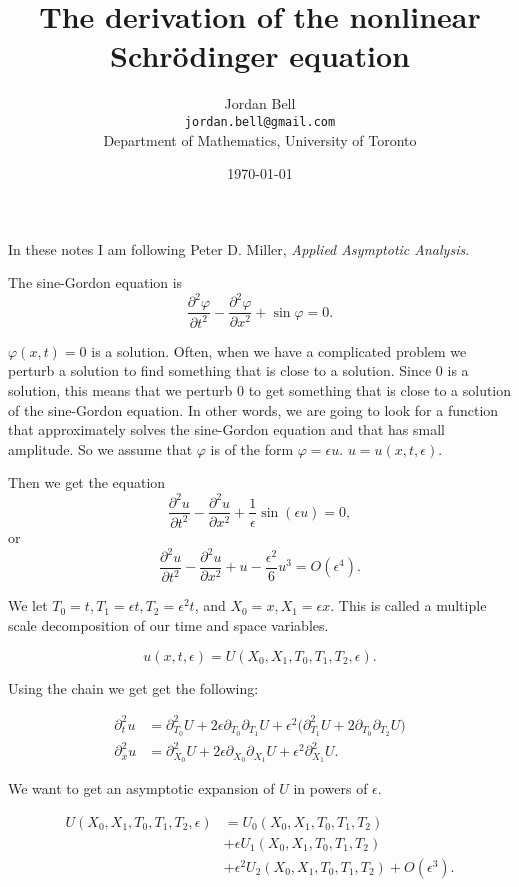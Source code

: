 \documentclass[11pt]{article}
\title{The derivation of the nonlinear Schr\"odinger equation}
\author{Jordan Bell\\ \texttt{jordan.bell@gmail.com}\\Department of Mathematics, University of Toronto}
\date{\today}
\begin{document}
\maketitle

In these notes I am following Peter D. Miller, {\em Applied Asymptotic Analysis}. 

The sine-Gordon equation is
\[
\frac{\partial^2 \varphi}{\partial t^2}-\frac{\partial^2 \varphi}{\partial x^2}+\sin \varphi=0.
\]

$\varphi(x,t)=0$ is a solution. Often, when we have a complicated problem we perturb a solution to find something that is close to a  solution. Since 0 is a solution, this means that we perturb 0 to get something that is close to a solution of the sine-Gordon equation. In other words, we are going to look for a function that approximately solves the sine-Gordon equation and that has small amplitude. So we assume that $\varphi$ is of the form $\varphi=\epsilon u$. $u=u(x,t,\epsilon)$.

Then we get the equation
\begin{equation}
\label{sinegordon}
\frac{\partial^2 u}{\partial t^2}-\frac{\partial^2 u}{\partial x^2}+\frac{1}{\epsilon} \sin (\epsilon u)=0,
\end{equation}
or
\[
\frac{\partial^2 u}{\partial t^2}-\frac{\partial^2 u}{\partial x^2}+u-\frac{\epsilon^2}{6}u^3=O(\epsilon^4).
\]


We let $T_0=t, T_1=\epsilon t, T_2=\epsilon^2 t$, and $X_0=x, X_1=\epsilon x$. This is called a multiple scale decomposition of our time and space variables.

\[
u(x,t,\epsilon)=U(X_0,X_1,T_0,T_1,T_2,\epsilon).
\]

Using the chain we get get the following:

\begin{align*}
\partial_t^2 u &=\partial_{T_0}^2 U + 2\epsilon \partial_{T_0}\partial_{T_1} U
+\epsilon^2 \Big( \partial_{T_1}^2 U + 2 \partial_{T_0} \partial_{T_2} U\Big)\\
\partial_x^2 u&=\partial_{X_0}^2 U +2\epsilon \partial_{X_0}\partial_{X_1}U
+\epsilon^2 \partial_{X_1}^2 U.
\end{align*}

We want to get an asymptotic expansion of $U$ in powers of $\epsilon$.

\begin{align*}
U(X_0,X_1,T_0,T_1,T_2,\epsilon)&=U_0(X_0,X_1,T_0,T_1,T_2)\\
&+\epsilon U_1(X_0,X_1,T_0,T_1,T_2)\\
&+\epsilon^2 U_2(X_0,X_1,T_0,T_1,T_2)
+O(\epsilon^3).
\end{align*}
\end{document}
